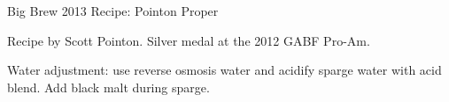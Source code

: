 \begin{recipe}{Big Brew 2013 Recipe: Pointon Proper} %

\begin{aboutblock}
Recipe by Scott Pointon. Silver medal at the 2012 GABF Pro-Am. \sourceaha
\end{aboutblock}


\begin{methodandtiming}

\begin{mashsteps}
\end{mashsteps}

\begin{fermentationsteps}
\end{fermentationsteps}

\begin{directions}
Water adjustment: use reverse osmosis water and acidify sparge water with 
acid blend. Add black malt during sparge.
\end{directions}

\end{methodandtiming}

\recipebreak

\begin{ingredientsblock}

\begin{malts}
\end{malts}

\begin{hops}
\end{hops}


\end{ingredientsblock}

\end{recipe}

